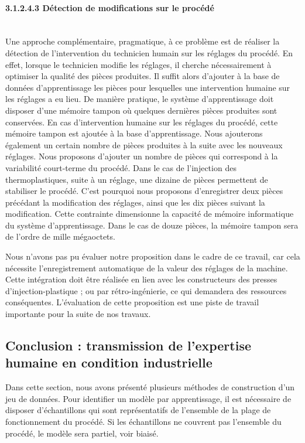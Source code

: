 \paragraph{3.1.2.4.3 Détection de modifications sur le procédé}\mbox{} \label{subsec:labelling_detection} \\
Une approche complémentaire, pragmatique, à ce problème est de réaliser la détection de l'intervention du technicien humain sur les réglages du procédé.
En effet, lorsque le technicien modifie les réglages, il cherche nécessairement à optimiser la qualité des pièces produites.
Il suffit alors d'ajouter à la base de données d'apprentissage les pièces pour lesquelles une intervention humaine sur les réglages a eu lieu.
De manière pratique, le système d'apprentissage doit disposer d'une mémoire tampon où quelques dernières pièces produites sont conservées.
En cas d'intervention humaine sur les réglages du procédé, cette mémoire tampon est ajoutée à la base d'apprentissage.
Nous ajouterons également un certain nombre de pièces produites à la suite avec les nouveaux réglages.
Nous proposons d'ajouter un nombre de pièces qui correspond à la variabilité court-terme du procédé.
Dans le cas de l'injection des thermoplastiques, suite à un réglage, une dizaine de pièces permettent de stabiliser le procédé.
C'est pourquoi nous proposons d'enregistrer deux pièces précédant la modification des réglages, ainsi que les dix pièces suivant la modification.
Cette contrainte dimensionne la capacité de mémoire informatique du système d'apprentissage.
Dans le cas de douze pièces, la mémoire tampon sera de l'ordre de mille mégaoctets.

Nous n'avons pas pu évaluer notre proposition dans le cadre de ce travail, car cela nécessite l'enregistrement automatique de la valeur des réglages de la machine.
Cette intégration doit être réalisée en lien avec les constructeurs des presses d'injection-plastique ; ou par rétro-ingénierie, ce qui demandera des ressources conséquentes.
L'évaluation de cette proposition est une piste de travail importante pour la suite de nos travaux.


\subsection{Conclusion : transmission de l'expertise humaine en condition industrielle} \label{sec:dataset_conclusion}
Dans cette section, nous avons présenté plusieurs méthodes de construction d'un jeu de données.
Pour identifier un modèle par apprentissage, il est nécessaire de disposer d'échantillons qui sont représentatifs de l'ensemble de la plage de fonctionnement du procédé.
Si les échantillons ne couvrent pas l'ensemble du procédé, le modèle sera partiel, voir biaisé.

